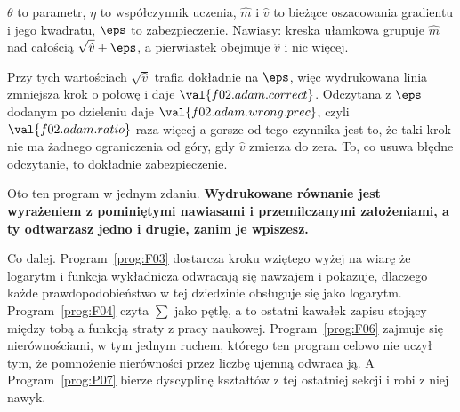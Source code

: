 \begin{fr}
\begin{ansblock}
$\theta$ to parametr, $\eta$ to współczynnik uczenia, $\hat{m}$ i $\hat{v}$ to
bieżące oszacowania gradientu i jego kwadratu, $\eps$ to zabezpieczenie.
Nawiasy: kreska ułamkowa grupuje $\hat{m}$ nad całością
$\sqrt{\hat{v}} + \eps$, a pierwiastek obejmuje $\hat{v}$ i nic więcej.
\begin{center}
\end{center}
Przy tych wartościach $\sqrt{\hat{v}}$ trafia dokładnie na $\eps$, więc
wydrukowana linia zmniejsza krok o połowę i daje
$\val{f02.adam.correct}$. Odczytana z $\eps$ dodanym po dzieleniu daje
$\val{f02.adam.wrong.prec}$, czyli $\val{f02.adam.ratio}$ raza więcej \dash{} a
gorsze od tego czynnika jest to, że taki krok nie ma żadnego ograniczenia od
góry, gdy $\hat{v}$ zmierza do zera. To, co usuwa błędne odczytanie, to
dokładnie zabezpieczenie.
\end{ansblock}

Oto ten program w jednym zdaniu. \textbf{Wydrukowane równanie jest wyrażeniem z
pominiętymi nawiasami i przemilczanymi założeniami, a ty odtwarzasz jedno i
drugie, zanim je wpiszesz.}

Co dalej. Program~\ref{prog:F03} dostarcza kroku wziętego wyżej na wiarę \dash{}
że logarytm i funkcja wykładnicza odwracają się nawzajem \dash{} i pokazuje,
dlaczego każde prawdopodobieństwo w tej dziedzinie obsługuje się jako logarytm.
Program~\ref{prog:F04} czyta $\sum$ jako pętlę, a to ostatni kawałek zapisu
stojący między tobą a funkcją straty z pracy naukowej.
Program~\ref{prog:F06} zajmuje się nierównościami, w tym jednym ruchem, którego
ten program celowo nie uczył \dash{} tym, że pomnożenie nierówności przez
liczbę ujemną odwraca ją. A Program~\ref{prog:P07} bierze dyscyplinę kształtów
z tej ostatniej sekcji i robi z niej nawyk.
\end{fr}

